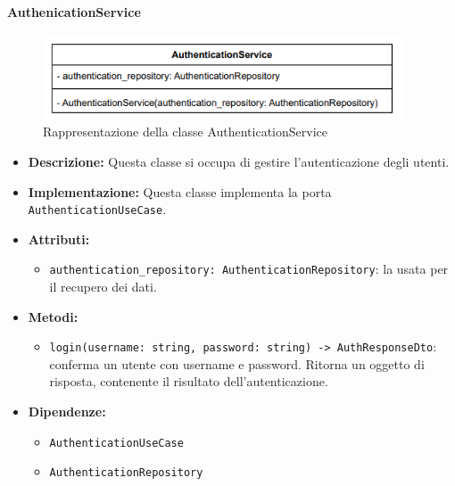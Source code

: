 
\paragraph{AuthenicationService} \label{AuthenticationService}
\begin{figure}[H]
    \centering
    \includegraphics[width=0.95\textwidth]{assets/Backend/authentication_service.png}
    \caption{Rappresentazione della classe AuthenticationService}
  \end{figure}
\begin{itemize}
    \item \textbf{Descrizione:} Questa classe si occupa di gestire l'autenticazione degli utenti.
    \item \textbf{Implementazione:} Questa classe implementa la porta \texttt{AuthenticationUseCase}.
    \item \textbf{Attributi:}
    \begin{itemize}
        \item \texttt{authentication\_repository: AuthenticationRepository}: la  usata per il recupero dei dati.
    \end{itemize}
    \item \textbf{Metodi:}
    \begin{itemize}
        \item \texttt{login(username: string, password: string) -> AuthResponseDto}: conferma un utente con username e password. Ritorna un oggetto di risposta, contenente il risultato dell'autenticazione.
    \end{itemize}
    \item \textbf{Dipendenze:}
    \begin{itemize}
        \item \texttt{AuthenticationUseCase}
        \item \texttt{AuthenticationRepository}
    \end{itemize}
\end{itemize}  

